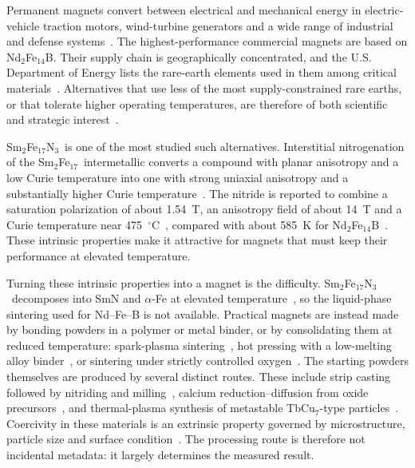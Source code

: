 \documentclass[10pt,twocolumn,letterpaper]{article}
\makeatletter
\renewcommand\section{\@startsection{section}{1}{\z@}{2.2ex plus .5ex}{1.2ex}{\centering\normalfont\small\bfseries\MakeUppercase}}
\newcommand{\SmFeN}{Sm$_2$Fe$_{17}$N$_3$}
\newcommand{\SmFe}{Sm$_2$Fe$_{17}$}
\makeatother
\begin{document}
\section{Introduction}

Permanent magnets convert between electrical and mechanical energy in electric-vehicle traction motors, wind-turbine generators and a wide range of industrial and defense systems~\cite{gutfleisch2011,coey2020}. The highest-performance commercial magnets are based on Nd$_2$Fe$_{14}$B. Their supply chain is geographically concentrated, and the U.S. Department of Energy lists the rare-earth elements used in them among critical materials~\cite{doe2023}. Alternatives that use less of the most supply-constrained rare earths, or that tolerate higher operating temperatures, are therefore of both scientific and strategic interest~\cite{coey2020}.

\SmFeN\ is one of the most studied such alternatives. Interstitial nitrogenation of the \SmFe\ intermetallic converts a compound with planar anisotropy and a low Curie temperature into one with strong uniaxial anisotropy and a substantially higher Curie temperature~\cite{coeysun1990}. The nitride is reported to combine a saturation polarization of about 1.54~T, an anisotropy field of about 14~T and a Curie temperature near 475~$^\circ$C~\cite{xu2024}, compared with about 585~K for Nd$_2$Fe$_{14}$B~\cite{saito2024}. These intrinsic properties make it attractive for magnets that must keep their performance at elevated temperature.

Turning these intrinsic properties into a magnet is the difficulty. \SmFeN\ decomposes into SmN and $\alpha$-Fe at elevated temperature~\cite{saito2024}, so the liquid-phase sintering used for Nd--Fe--B is not available. Practical magnets are instead made by bonding powders in a polymer or metal binder, or by consolidating them at reduced temperature: spark-plasma sintering~\cite{saito2024}, hot pressing with a low-melting alloy binder~\cite{zheng2022}, or sintering under strictly controlled oxygen~\cite{soda2016}. The starting powders themselves are produced by several distinct routes. These include strip casting followed by nitriding and milling~\cite{liang2023}, calcium reduction--diffusion from oxide precursors~\cite{saito2024,zheng2020,okada2017}, and thermal-plasma synthesis of metastable TbCu$_7$-type particles~\cite{hirayama2025}. Coercivity in these materials is an extrinsic property governed by microstructure, particle size and surface condition~\cite{kronmuller2003}. The processing route is therefore not incidental metadata: it largely determines the measured result.
\end{document}
